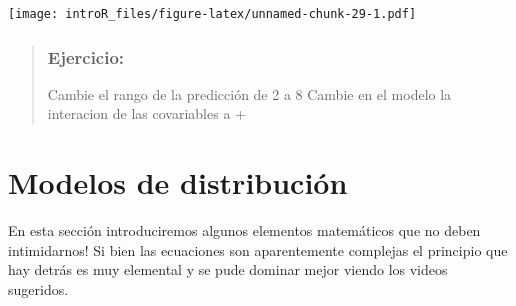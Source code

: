 \documentclass[
]{book}
\newenvironment{Shaded}{\begin{snugshade}}{\end{snugshade}}
\newcommand{\CommentTok}[1]{\textcolor[rgb]{0.56,0.35,0.01}{\textit{#1}}}
\newcommand{\DataTypeTok}[1]{\textcolor[rgb]{0.13,0.29,0.53}{#1}}
\newcommand{\DecValTok}[1]{\textcolor[rgb]{0.00,0.00,0.81}{#1}}
\newcommand{\FloatTok}[1]{\textcolor[rgb]{0.00,0.00,0.81}{#1}}
\newcommand{\KeywordTok}[1]{\textcolor[rgb]{0.13,0.29,0.53}{\textbf{#1}}}
\newcommand{\NormalTok}[1]{#1}
\newcommand{\OperatorTok}[1]{\textcolor[rgb]{0.81,0.36,0.00}{\textbf{#1}}}
\newcommand{\StringTok}[1]{\textcolor[rgb]{0.31,0.60,0.02}{#1}}
\begin{document}
\begin{Shaded}
\end{Shaded}

\texttt{[image: introR\_files/figure-latex/unnamed-chunk-29-1.pdf]}

\begin{quote}
\hypertarget{ejercicio-5}{%
\subsection{Ejercicio:}\label{ejercicio-5}}

Cambie el rango de la predicción de 2 a 8
Cambie en el modelo la interacion de las covariables a +
\end{quote}

\hypertarget{modelos-de-distribuciuxf3n}{%
\chapter{Modelos de distribución}\label{modelos-de-distribuciuxf3n}}

En esta sección introduciremos algunos elementos matemáticos que no deben intimidarnos! Si bien las ecuaciones son aparentemente complejas el principio que hay detrás es muy elemental y se pude dominar mejor viendo los videos sugeridos.
\end{document}
